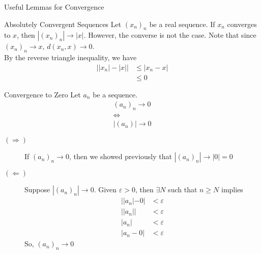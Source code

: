 \documentclass[8pt]{extarticle}
\begin{document}
  \begin{problem}{Useful Lemmas for Convergence}
    \begin{problem}{Absolutely Convergent Sequences}
      Let $(x_n)_n$ be a real sequence. If $x_n$ converges to $x$, then $|(x_n)_n|\rightarrow |x|$. However, the converse is not the case.
      \tcblower
      Note that since $(x_n)_n \rightarrow x$, $d(x_n,x) \rightarrow 0$.\\

      By the reverse triangle inequality, we have
      \begin{align*}
        \left||x_n| - |x|\right| &\leq |x_n - x|\\
        &\leq 0
      \end{align*}
    \end{problem}
    \begin{problem}{Convergence to Zero}
      Let $a_n$ be a sequence.
      \begin{align*}
        (a_n)_n \rightarrow 0\\
        \Leftrightarrow\\
        |(a_n)| \rightarrow 0
      \end{align*}
      \tcblower
      \begin{description}
        \item[$(\Rightarrow)$] If $(a_n)_n \rightarrow 0$, then we showed previously that $|(a_n)_n| \rightarrow |0| = 0$
        \item[$(\Leftarrow)$] Suppose $|(a_n)_n| \rightarrow 0$. Given $\varepsilon > 0$, then $\exists N$ such that $n \geq N$ implies
          \begin{align*}
            ||a_n|-0| &< \varepsilon\\
            ||a_n|| &< \varepsilon\\
            |a_n| &< \varepsilon\\
            |a_n - 0| &< \varepsilon
          \end{align*}
          So, $\left(a_n\right)_n \rightarrow 0$
      \end{description}
    \end{problem}
  \end{problem}
\end{document}
